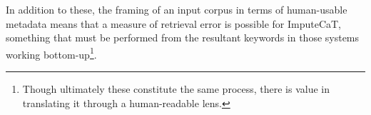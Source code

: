 In addition to these, the framing of an input corpus in terms of human-usable metadata means that a measure of retrieval error is possible for ImputeCaT, something that must be performed from the resultant keywords in those systems working bottom-up\footnote{Though ultimately these constitute the same process, there is value in translating it through a human-readable lens.}.



